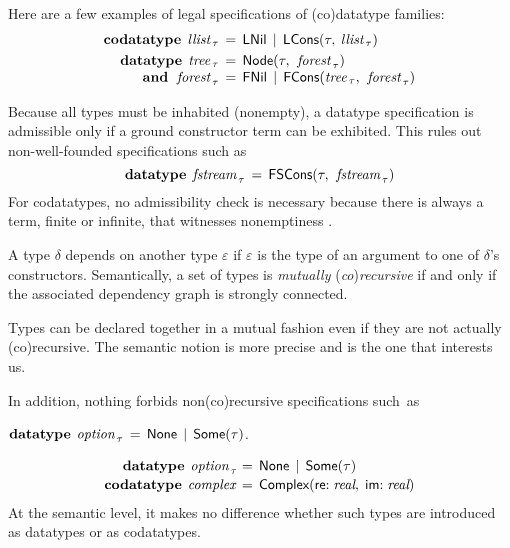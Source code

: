 \begin{rep}%
Here are a few examples of legal specifications of (co)datatype families:
\[\begin{aligned}[t]
      \keyw{codatatype}\; \,\ty{llist}_{\,\tau} & \,=\, \const{LNil} \,\mid\, \const{LCons}(%
      \tau,\: %
      \ty{llist}_{\,\tau}) \\%
      \keyw{datatype}\;\, \ty{tree}_{\,\tau} & \,=\, \const{Node}(\tau,\:\, \ty{forest}_{\,\tau}) \\[-\jot]
      \keyw{and}\;\,\, \ty{forest}_{\,\tau} & \,=\, \const{FNil} \,\mid\, \const{FCons}(\ty{tree}_{\,\tau},\:\, \ty{forest}_{\,\tau})
\end{aligned}
\]

Because all types must be inhabited (nonempty), a datatype specification is
admissible only if a ground constructor term can be exhibited.
This rules out non-well-founded specifications such as
\[\textbf{datatype}\;\, \textit{fstream}_{\,\tau} \,=\, \textsf{FSCons}(\tau,\:\, \textit{fstream}_{\,\tau})\]
For codatatypes, no admissibility check is necessary because there is always a term,
finite or infinite, that witnesses nonemptiness \cite{blanchette-et-al-2015-esop}.
\end{rep}

A type $\delta$ depends on another type $\varepsilon$ if $\varepsilon$ is the
type of an argument to one of $\delta$'s constructors. Semantically, a set of
types is \emph{mutually} (\emph{co})\emph{recursive} if and only if the
associated dependency graph is strongly connected.
\begin{rep}%
Types can be declared together in a mutual fashion even if they are not actually
(co)recursive. The semantic notion is more precise and is the one that interests
us.
\end{rep}%
%
In addition, nothing forbids non(co)recursive specifications
such~as
\begin{conf}%
\vthinspace$\keyw{datatype}~\vthinspace\ty{option}_{\,\tau} \,=\, \const{None} \,\mid\, \const{Some}(\tau)$.%
\end{conf}%
\begin{rep}%
\[\begin{aligned}[t]
      \keyw{datatype}~\vthinspace\ty{option}_{\,\tau\!} & \,=\, \const{None} \,\mid\, \const{Some}(\tau) \\[-.5\jot]
      \keyw{codatatype}~\vthinspace\ty{complex} & \,=\, \const{Complex}(\const{re}{:}\; \ty{real},\; \const{im}{:}\;\ty{real})
\end{aligned}
\]
At the semantic level, it makes no difference whether such types are
introduced as datatypes or as codatatypes.
\end{rep}%

